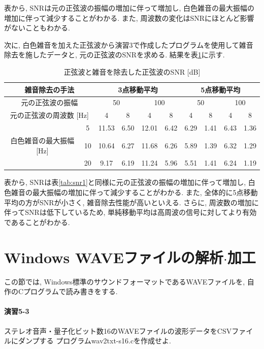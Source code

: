 \documentclass[titlepage]{jsarticle}
\begin{document}
        表から, SNRは元の正弦波の振幅の増加に伴って増加し,
        白色雑音の最大振幅の増加に伴って減少することがわかる.
        また, 周波数の変化はSNRにほとんど影響がないこともわかる.

        次に, 白色雑音を加えた正弦波から演習3で作成したプログラムを使用して雑音除去を施したデータと,
        元の正弦波のSNRを求める. 結果を表\ref{tab:snr2}に示す.

        \begin{table}[h]
            \centering
            \caption{正弦波と雑音を除去した正弦波のSNR [dB]}
            \label{tab:snr2}
            \begin{tabular}{c|c||cc|cc|cc|cc} \hline
                \multicolumn{2}{c||}{雑音除去の手法} & \multicolumn{4}{c|}{3点移動平均} & \multicolumn{4}{c}{5点移動平均} \\ \hline
                \multicolumn{2}{c||}{元の正弦波の振幅} & \multicolumn{2}{c|}{50} & \multicolumn{2}{c|}{100} & \multicolumn{2}{c|}{50} & \multicolumn{2}{c}{100} \\ \hline
                \multicolumn{2}{c||}{元の正弦波の周波数 [Hz]} & 4 & 8 & 4 & 8 & 4 & 8 & 4 & 8 \\ \hline \hline
                & 5 & 11.53 & 6.50 & 12.01 & 6.42 & 6.29 & 1.41 & 6.43 & 1.36 \\
                白色雑音の最大振幅 [Hz] & 10 & 10.64 & 6.27 & 11.68 & 6.26 & 5.89 & 1.39 & 6.32 & 1.29 \\
                & 20 & 9.17 & 6.19 & 11.24 & 5.96 & 5.51 & 1.41 & 6.24 & 1.19 \\ \hline
            \end{tabular}
        \end{table}
        
        表から, SNRは表\ref{tab:snr1}と同様に元の正弦波の振幅の増加に伴って増加し,
        白色雑音の最大振幅の増加に伴って減少することがわかる.
        また, 全体的に5点移動平均の方がSNRが小さく, 雑音除去性能が高いといえる.
        さらに, 周波数の増加に伴ってSNRは低下しているため,
        単純移動平均は高周波の信号に対してより有効であることがわかる.

\section{Windows WAVEファイルの解析$\cdot$加工}
    この節では, Windows標準のサウンドフォーマットであるWAVEファイルを,
    自作のCプログラムで読み書きをする.

    \paragraph{演習5-3} ステレオ音声・量子化ビット数16のWAVEファイルの波形データをCSVファイルにダンプする
    プログラムwav2txt-s16.cを作成せよ.
\end{document}
